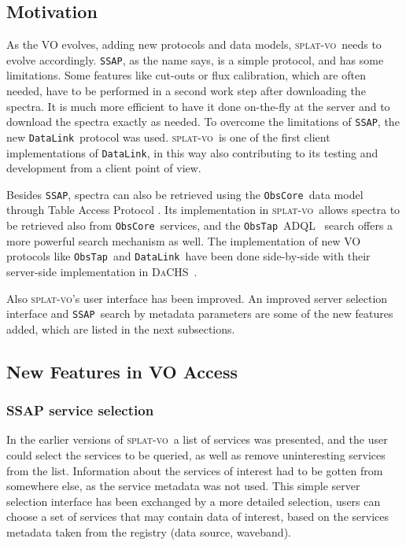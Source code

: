 \documentclass[final,authoryear,5p,times,twocolumn]{elsarticle}
\newcommand{\datalink}{\texttt{DataLink}}
\newcommand{\ssap}{\texttt{SSAP}}
\newcommand{\obstap}{\texttt{ObsTap}}
\newcommand{\obscore}{\texttt{ObsCore}}
\newcommand{\adql}{ADQL}
\newcommand{\splatvo}{\textsc{splat-vo}}
\newcommand{\dachs}{\textsc{DaCHS}}
\begin{document}
\subsection{Motivation}

As the VO evolves, adding new protocols and data models, \splatvo\ needs to
evolve accordingly.  \ssap, as the name says, is a simple protocol, and has
some limitations. Some features like cut-outs or flux calibration, which are
often needed, have to be performed in a second work step after downloading the
spectra. It is much more efficient to have it done on-the-fly at the server
and  to download the spectra exactly as needed. To overcome the limitations of
\ssap, the new \datalink\ protocol \citep{datalink} was used. \splatvo\
is one of the first client implementations of \datalink, in this way
also contributing to its testing and development from a client point of view.

Besides \ssap, spectra can also be retrieved using the \obscore\ data model
through Table Access Protocol  \citep[known as \obstap;][]{obstap}. Its implementation in
\splatvo\ allows spectra to be retrieved also from \obscore\ services, and
the \obstap\ \adql\ \citep{adql} search offers a more powerful search
mechanism as well. The implementation of new VO protocols like \obstap\
and \datalink\ have been done side-by-side with their server-side
implementation in \dachs\ \citep[Data Center Helper Suite;][]{dachs}.

Also \splatvo's user interface has been improved. An improved server
selection interface and \ssap\ search by metadata parameters are some of
the new features added, which are listed in the next subsections.

\subsection{New Features in VO Access}

\subsubsection{SSAP service selection}

In the earlier versions of \splatvo\ a list of services was presented, and
the user could select the services to be queried, as well as remove
uninteresting services from the list. Information about the services
of interest had to be gotten from somewhere else, as the service
metadata was not used.  This simple server selection interface has
been exchanged by a more detailed selection, users can choose a set of
services that may contain data of interest, based on the services
metadata taken from the registry (data source, waveband).
\end{document}
